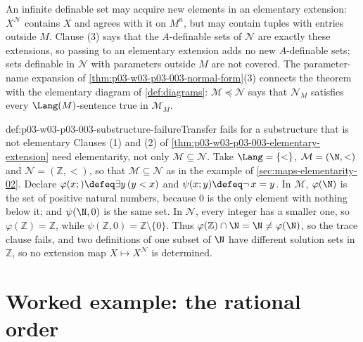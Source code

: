 An infinite definable set may acquire new elements in an elementary
extension: \(X^{\mathcal N}\) contains \(X\) and agrees with it on \(M^n\),
but may contain tuples with entries outside \(M\).  Clause (3) says that the
\(A\)-definable sets of \(\mathcal N\) are exactly these extensions, so
passing to an elementary extension adds no new \(A\)-definable sets; sets
definable in \(\mathcal N\) with parameters outside \(M\) are not covered.
The parameter-name expansion of \cref{thm:p03-w03-p03-003-normal-form}(3)
connects the theorem with the elementary diagram of \cref{def:diagrams}:
\(\mathcal M\preccurlyeq\mathcal N\) says that \(\mathcal N_M\) satisfies
every \(\Lang(M)\)-sentence true in \(\mathcal M_M\).

\begin{hbwarning}{def:p03-w03-p03-003-substructure-failure}{Transfer fails for a substructure that is not elementary}
Clauses (1) and (2) of \cref{thm:p03-w03-p03-003-elementary-extension} need
elementarity, not only \(\mathcal M\subseteq\mathcal N\).  Take
\(\Lang=\{<\}\), \(\mathcal M=(\N,<)\) and \(\mathcal N=(\mathbb Z,<)\), so
that \(\mathcal M\subseteq\mathcal N\) as in the example of
\cref{sec:maps-elementarity-02}.  Declare
\(\varphi(x;)\defeq\exists y\,(y<x)\) and
\(\psi(x;y)\defeq\neg\,x=y\).  In \(\mathcal M\), \(\varphi(\N)\) is the set
of positive natural numbers, because \(0\) is the only element with nothing
below it; and \(\psi(\N,0)\) is the same set.  In \(\mathcal N\), every
integer has a smaller one, so \(\varphi(\mathbb Z)=\mathbb Z\), while
\(\psi(\mathbb Z,0)=\mathbb Z\setminus\{0\}\).  Thus
\(\varphi(\mathbb Z)\cap\N=\N\neq\varphi(\N)\), so the trace clause fails,
and two definitions of one subset of \(\N\) have different solution sets in
\(\mathbb Z\), so no extension map \(X\mapsto X^{\mathcal N}\) is
determined.
\end{hbwarning}

\section{Worked example: the rational order}
\label{sec:p03-w03-p03-003-example}

